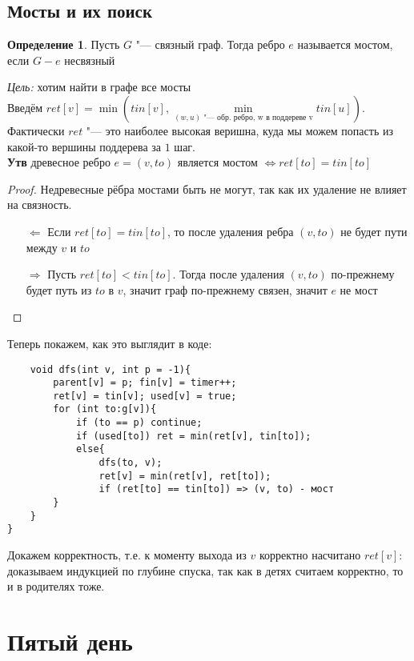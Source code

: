 \documentclass[a4paper, 12pt]{article}
\theoremstyle{plain}
\theoremstyle{definition}
\newtheorem{definition}{Определение}
\theoremstyle{remark}
\begin{document}
\subsection{Мосты и их поиск}
\begin{definition}
	Пусть $G$ "--- связный граф. Тогда ребро $e$ называется мостом, если $G-e$ несвязный
\end{definition}
\textit{Цель:} хотим найти в графе все мосты\\
Введём $ret[v]=\min(tin[v], \min\limits_{(w,u) \text{ "--- обр. ребро, w в поддереве v}}tin[u])$.  Фактически $ret$ "--- это наиболее высокая веришна, куда мы можем попасть из какой-то вершины поддерева за $1$ шаг.\\
\textbf{Утв} древесное ребро $e=(v, to)$ является мостом $\Leftrightarrow ret[to]=tin[to]$
\begin{proof}
	Недревесные рёбра мостами быть не могут, так как их удаление не влияет на связность.
	\begin{itemize}
		\item[$\Leftarrow$] Если $ret[to]=tin[to]$, то после удаления ребра $(v, to)$ не будет пути между $v$ и $to$
		\item[$\Rightarrow$] Пусть $ret[to]<tin[to]$. Тогда после удаления $(v, to)$ по-прежнему будет путь из $to$ в $v$, значит граф по-прежнему связен, значит $e$ не мост
	\end{itemize}
\end{proof}
Теперь покажем, как это выглядит в коде:
\begin{verbatim}
	void dfs(int v, int p = -1){
	    parent[v] = p; fin[v] = timer++;
	    ret[v] = tin[v]; used[v] = true;
	    for (int to:g[v]){
	        if (to == p) continue;
	        if (used[to]) ret = min(ret[v], tin[to]);
	        else{
	            dfs(to, v);
	            ret[v] = min(ret[v], ret[to]);
	            if (ret[to] == tin[to]) => (v, to) - мост
        }
    }
}
\end{verbatim}
Докажем корректность, т.е. к моменту выхода из $v$ корректно насчитано $ret[v]$: доказываем индукцией по глубине спуска, так как в детях считаем корректно, то и в родителях тоже.
\section{Пятый день}
\end{document}
